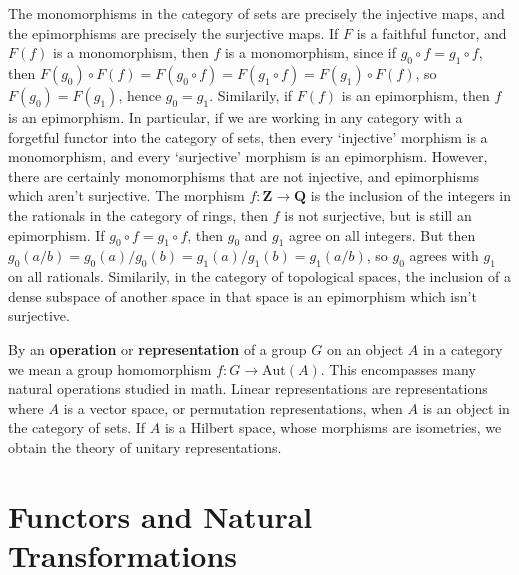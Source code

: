 \begin{example}
    The monomorphisms in the category of sets are precisely the injective maps, and the epimorphisms are precisely the surjective maps. If $F$ is a faithful functor, and $F(f)$ is a monomorphism, then $f$ is a monomorphism, since if $g_0 \circ f = g_1 \circ f$, then $F(g_0) \circ F(f) = F(g_0 \circ f) = F(g_1 \circ f) = F(g_1) \circ F(f)$, so $F(g_0) = F(g_1)$, hence $g_0 = g_1$. Similarily, if $F(f)$ is an epimorphism, then $f$ is an epimorphism. In particular, if we are working in any category with a forgetful functor into the category of sets, then every `injective' morphism is a monomorphism, and every `surjective' morphism is an epimorphism. However, there are certainly monomorphisms that are not injective, and epimorphisms which aren't surjective. The morphism $f: \mathbf{Z} \to \mathbf{Q}$ is the inclusion of the integers in the rationals in the category of rings, then $f$ is not surjective, but is still an epimorphism. If $g_0 \circ f = g_1 \circ f$, then $g_0$ and $g_1$ agree on all integers. But then $g_0(a/b) = g_0(a)/g_0(b) = g_1(a)/g_1(b) = g_1(a/b)$, so $g_0$ agrees with $g_1$ on all rationals. Similarily, in the category of topological spaces, the inclusion of a dense subspace of another space in that space is an epimorphism which isn't surjective.
\end{example}

By an {\bf operation} or {\bf representation} of a group $G$ on an object $A$ in a category we mean a group homomorphism $f: G \to \text{Aut}(A)$. This encompasses many natural operations studied in math. Linear representations are representations where $A$ is a vector space, or permutation representations, when $A$ is an object in the category of sets. If $A$ is a Hilbert space, whose morphisms are isometries, we obtain the theory of unitary representations.

\section{Functors and Natural Transformations}

